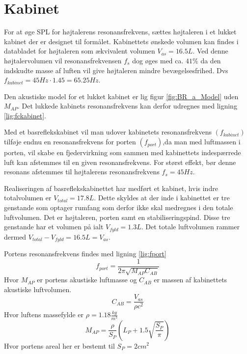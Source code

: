 \section{Kabinet}

For at øge SPL for højtalerens resonansfrekvens, sættes højtaleren i et lukket kabinet der er designet til formålet.
Kabinettets ønskede volumen kan findes i databladet for højtaleren\cite{FW168} som ækvivalent volumen $V_{as} = 16.5L$. Ved denne højtalervolumen vil resonansfrekvensen $f_s$ dog øges med ca. $41\%$ da den indskudte masse af luften vil give højtaleren mindre bevægelsesfrihed. Dvs $f_{kabinet}=45Hz\cdot1.45=65.25Hz$. 

Den akustiske model for et lukket kabinet er lig figur \ref{fig:BR_a_Model} uden $M_{AP}$. Det lukkede kabinets resonansfrekvens kan derfor udregnes med ligning \ref{lig:fckabinet}.

Med et basreflekskabinet vil man udover kabinetets resonansfrekvens $(f_{kabinet})$ tilføje endnu en resonansfrekvens for porten $(f_{port})$,da man med luftmassen i porten, vil skabe en fjedervirkning som sammen med kabinettets indespærrede luft kan afstemmes til en given resonansfrekvens. For størst effekt, bør denne resonans afstemmes til højtalerens resonansfrekvens $f_s = 45Hz$.

Realiseringen af basreflekskabinettet har medført et kabinet, hvis indre totalvolumen er $V_{total}=17.8L$. Dette skyldes at der inde i kabinettet er tre genstande som optager rumfang som derfor ikke skal medregnes i den totale luftvolumen. Det er højtaleren, porten samt en stabiliseringspind. Disse tre genstande har et volumen på ialt $V_{fyld}=1.3L$. Det totale luftvolumen rammer dermed $V_{total}-V_{fyld}=16.5L=V_{as}$.

Portens resonansfrekvens findes med ligning \ref{lig:fport}
\begin{equation}\label{lig:fport}
f_{port}=\frac{1}{2 \pi \sqrt{M_{AP} C_{AB}}}
\end{equation}
Hvor $M_{AP}$ er portens akustiske luftmasse og $C_{AB}$ er massen af kabinettets akustiske luftvolumen.
\begin{equation}\label{lig:CAB}
C_{AB}=\frac{V_{as}}{\rho c^2}
	\end{equation}
	Hvor luftens massefylde er $\rho=1.18 \frac{kg}{m^3}$ 
\begin{equation}\label{lig:MAP}
M_{AP}=\frac{\rho}{S_P} (L_P+1.5\sqrt{\frac{S_P}{\pi}})
\end{equation}	
Hvor portens areal her er bestemt til $S_P=2cm^2$

